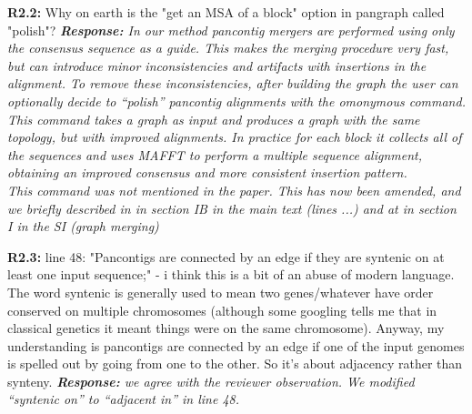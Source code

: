 \documentclass[aps,rmp,onecolumn]{revtex4-1}
\newcommand{\Marco}[1]{{\color{gray}Marco: #1}}
\newcommand{\Liam}[1]{{\color{teal}Liam: #1}}
\newcommand{\reviewer}[2]{\textbf{#1:} #2\vskip 5mm}
\newcommand{\response}[1]{{\it {\color{response}\textbf{Response:} #1}}\vskip 5mm}
\begin{document}
\reviewer{R2.2}{Why on earth is the "get an MSA of a block" option in pangraph called "polish"?}
\response{In our method pancontig mergers are performed using only the consensus sequence as a guide. This makes the merging procedure very fast, but can introduce minor inconsistencies and artifacts with insertions in the alignment. To remove these inconsistencies, after building the graph the user can optionally decide to ``polish'' pancontig alignments with the omonymous command. This command takes a graph as input and produces a graph with the same topology, but with improved alignments. In practice for each block it collects all of the sequences and uses MAFFT \cite{katoh2002mafft} to perform a multiple sequence alignment, obtaining an improved consensus and more consistent insertion pattern.\\
      This command was not mentioned in the paper. This has now been amended, and we briefly described in in section IB in the main text (lines ...) and at in section I in the SI (graph merging) }

\reviewer{R2.3}{line 48: "Pancontigs are connected by an edge if they are syntenic on at least one input sequence;" - i think this is a bit of an abuse of modern language. The word syntenic is generally used to mean two genes/whatever have order conserved on multiple chromosomes (although some googling tells me that in classical genetics it meant things were on the same chromosome). Anyway, my understanding is pancontigs are connected by an edge if one of the input genomes is spelled out by going from one to the other. So it's about adjacency rather than synteny.}
\response{we agree with the reviewer observation. We modified ``syntenic on'' to ``adjacent in'' in line 48.}
\end{document}
